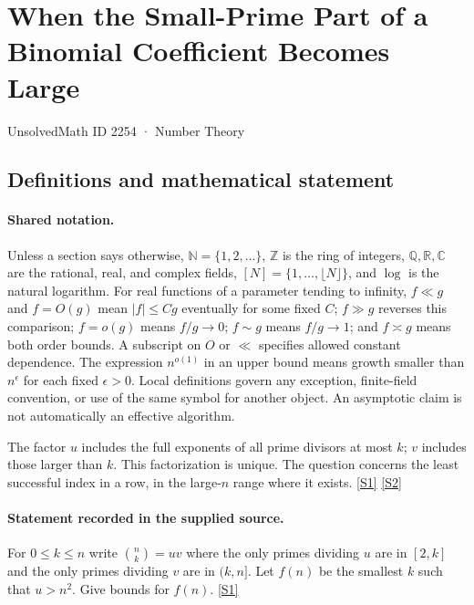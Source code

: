 \documentclass[11pt,a4paper]{article}
\newcommand{\N}{\mathbb{N}}
\newcommand{\Z}{\mathbb{Z}}
\newcommand{\Q}{\mathbb{Q}}
\newcommand{\R}{\mathbb{R}}
\newcommand{\C}{\mathbb{C}}
\newcommand{\sref}[2]{\hyperlink{source:#1:#2}{[S#2]}}
\begin{document}

\setcounter{section}{2253}

\section{When the Small-Prime Part of a Binomial Coefficient Becomes Large}\label{2254}

{\small\sffamily UnsolvedMath ID 2254 · Number Theory}

\subsection{Definitions and mathematical statement}

\paragraph{Shared notation.}Unless a section says otherwise, $\N=\{1,2,\ldots\}$,
$\Z$ is the ring of integers, $\Q,\R,\C$ are the rational, real, and complex
fields, $[N]=\{1,\ldots,\lfloor N\rfloor\}$, and $\log$ is the natural
logarithm. For real functions of a parameter tending to infinity,
$f\ll g$ and $f=O(g)$ mean $|f|\leq Cg$ eventually for some fixed $C$;
$f\gg g$ reverses this comparison; $f=o(g)$ means $f/g\to0$;
$f\sim g$ means $f/g\to1$; and $f\asymp g$ means both order bounds.
A subscript on $O$ or $\ll$ specifies allowed constant dependence.
The expression $n^{o(1)}$ in an upper bound means growth smaller than
$n^\epsilon$ for each fixed $\epsilon>0$. Local definitions govern any
exception, finite-field convention, or use of the same symbol for another
object. An asymptotic claim is not automatically an effective algorithm.



The factor $u$ includes the full exponents of all prime divisors at most $k$; $v$ includes those larger than $k$. This factorization is unique. The question concerns the least successful index in a row, in the large-$n$ range where it exists. \sref{2254}{1} \sref{2254}{2}

\paragraph{Statement recorded in the supplied source.}
For $0\leq k\leq n$ write $ \binom{n}{k} = uv $ where the only primes dividing $u$ are in $[2,k]$ and the only primes dividing $v$ are in $(k,n]$.
Let $f(n)$ be the smallest $k$ such that $u>n^2$. Give bounds for $f(n)$. \sref{2254}{1}
\end{document}
